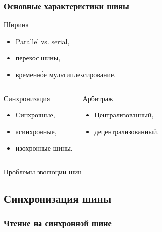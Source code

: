 \begin{frame}
\frametitle{Основные характеристики шины}
\pause
\begin{block}{Ширина}\pause
\begin{itemize}[<+->]
    \item Parallel vs. serial,
    \item перекос шины,
    \item временн\'{о}е мультиплексирование.
\end{itemize}
\end{block}

\begin{columns}
    \column{5cm}
    \pause

    \begin{block}{Синхронизация}
    \begin{itemize}
        \item Синхронные,
        \item асинхронные,
        \item изохронные шины.
    \end{itemize}
    \end{block}

    \column{5cm}
    \pause

    \begin{block}{Арбитраж}
    \begin{itemize}
        \item Централизованный,
        \item децентрализованный.
    \end{itemize}
    \end{block}

\end{columns}
\end{frame}

\begin{block}{Проблемы эволюции шин}
\end{block}

\subsection{Синхронизация шины}

\begin{frame}
\frametitle{Чтение на синхронной шине}
\end{frame}

